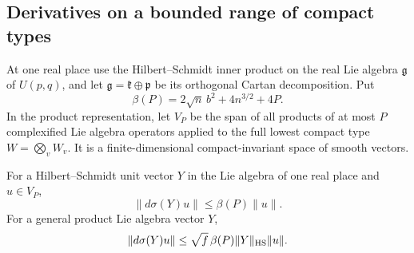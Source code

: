 \subsection{Derivatives on a bounded range of compact types}

At one real place use the Hilbert--Schmidt inner
product on the real Lie algebra \(\mathfrak g\) of
\(U(p,q)\), and let \(\mathfrak g=\mathfrak k\oplus
\mathfrak p\) be its orthogonal Cartan decomposition.
Put
\[
                \beta(P)=2\sqrt n\,b^2+4n^{3/2}+4P.
\]
In the product representation, let \(V_P\) be the
span of all products of at most \(P\) complexified
Lie algebra operators applied to the full lowest
compact type \(W=\bigotimes_v W_v\).
It is a finite-dimensional compact-invariant space
of smooth vectors.

\begin{lemma}\label{dc-derivative}
For a Hilbert--Schmidt unit vector \(Y\) in the Lie
algebra of one real place and \(u\in V_P\),
\[
                  \|d\sigma(Y)u\|\le\beta(P)\|u\|.
\]
For a general product Lie algebra vector \(Y\),
\begin{equation}\label{dc-derivative-bound}
       \|d\sigma(Y)u\|
                   \le\sqrt f\,\beta(P)\|Y\|_{\rm HS}\|u\|.
\end{equation}
\end{lemma}
